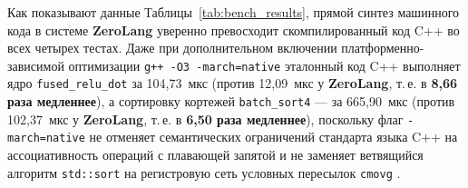 \documentclass[11pt,a4paper]{article}
\begin{document}
\begin{table}[ht!]
\centering
\caption{Экспериментальное сравнение времени выполнения (мкс) и кратности ускорения системы ZeroLang относительно Python 3.11 и оптимизирующего компилятора C++ (\texttt{GCC 12.2.0 -O2} и \texttt{-O3})}
\label{tab:bench_results}
\vspace{4pt}
\end{table}

Как показывают данные Таблицы~\ref{tab:bench_results}, прямой синтез машинного кода в системе \textbf{ZeroLang} уверенно превосходит скомпилированный код C++ во всех четырех тестах. Даже при дополнительном включении платформенно-зависимой оптимизации \texttt{g++ -O3 -march=native} эталонный код C++ выполняет ядро \texttt{fused\_relu\_dot} за 104,73~мкс (против 12,09~мкс у \textbf{ZeroLang}, т.\,е. в \textbf{8,66 раза медленнее}), а сортировку кортежей \texttt{batch\_sort4} — за 665,90~мкс (против 102,37~мкс у \textbf{ZeroLang}, т.\,е. в \textbf{6,50 раза медленнее}), поскольку флаг \texttt{-march=native} не отменяет семантических ограничений стандарта языка C++ на ассоциативность операций с плавающей запятой и не заменяет ветвящийся алгоритм \texttt{std::sort} на регистровую сеть условных пересылок \texttt{cmovg} \cite{bunel2017}.
\end{document}
